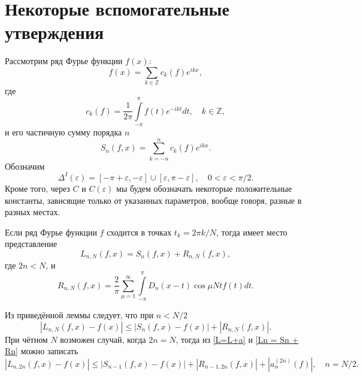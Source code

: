 \section{Некоторые вспомогательные утверждения}


Рассмотрим ряд Фурье функции $f(x)$:
\begin{equation*}
	f(x) = \sum\limits_{k\in \mathbb{Z}} c_k(f)e^{ikx},
\end{equation*}
где
\begin{equation*}
	c_k(f) = \frac{1}{2\pi}\int\limits_{-\pi}^{\pi}f(t)e^{-ik t} dt, \quad k \in \mathbb{Z},
\end{equation*}
и его частичную сумму порядка $n$
\begin{equation*}
	S_n(f, x) = \sum\limits_{k = -n}^{n} c_k(f)e^{ikx}.
\end{equation*}
Обозначим
$$\Delta^I(\varepsilon) = [-\pi + \varepsilon,- \varepsilon] \cup [\varepsilon, \pi - \varepsilon], \quad 0 < \varepsilon < \pi/2.$$
Кроме того, через $C$ и $C(\varepsilon)$ мы будем обозначать некоторые положительные константы, зависящие только от указанных параметров, вообще говоря, разные в разных местах.

\begin{lemma} \label{theorem sharapudinov}
	Если ряд Фурье функции $f$ сходится в точках $t_k = 2\pi k/N$, тогда имеет место представление
	\begin{equation*}
		L_{n,N}(f,x) = S_n(f,x) + R_{n,N}(f,x), \label{iishar_Ln_eq_Sn_Rn}
	\end{equation*}
	где $2n < N$, и
	\begin{equation}\label{RfromLemma}
		R_{n,N}(f,x) = \frac2\pi \sum\limits_{\mu=1}^{\infty} \int\limits_{-\pi}^{\pi} D_n(x-t) \cos \mu N t f(t) dt.
	\end{equation}
\end{lemma}
Из приведённой леммы следует, что при $n < N/2$
\begin{equation}\label{Ln = Sn + Rn}
	|L_{n,N}(f,x) - f(x)| \leq |S_n(f,x) - f(x)| + |R_{n,N}(f,x)|.
\end{equation}
При чётном $N$ возможен случай, когда $2n = N$, тогда из \eqref{L=L+a} и \eqref{Ln = Sn + Rn} можно записать
\begin{equation}\label{L<SRa}
	|L_{n,2n}(f,x) - f(x)| \leq |S_{n-1}(f,x) - f(x)| + |R_{n-1,2n}(f,x)| + |a_n^{(2n)}(f)|,\quad n=N/2.
\end{equation}



